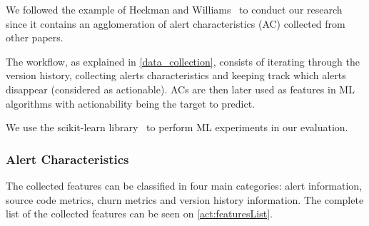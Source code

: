 We followed the example of Heckman and Williams~\cite{model_building_actionable} to conduct our research since it contains an agglomeration of alert characteristics (AC) collected from other papers.

The workflow, as explained in \cref{data_collection}, consists of iterating through the version history, collecting alerts characteristics and keeping track which alerts disappear (considered as actionable). ACs are then later used as features in ML algorithms with actionability being the target to predict.

We use the scikit-learn library~\cite{scikit-learn} to perform ML experiments in our evaluation.

\subsubsection{Alert Characteristics}

The collected features can be classified in four main categories: alert information, source code metrics, churn metrics and version history information. The complete list of the collected features can be seen on \cref{act:featuresList}.

%
%
%
%
%


